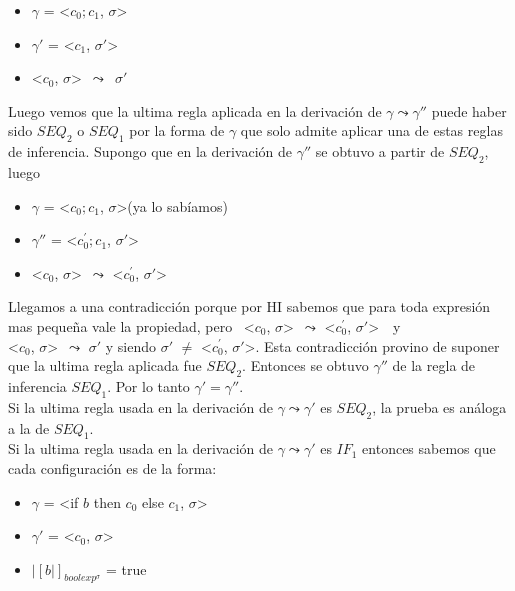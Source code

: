 \documentclass[a4paper,12pt]{article}
\begin{document}
\begin{itemize}
  \item $\gamma$ = \textless $c_{0};c_{1}$, $\sigma$\textgreater
  \item $\gamma'$ =  \textless $c_{1}$, $\sigma'$\textgreater
  \item \textless $c_{0}$, $\sigma$\textgreater \ $\leadsto$\ $\sigma'$
\end{itemize}

Luego vemos que la ultima regla aplicada en la derivación de $\gamma \leadsto \gamma''$ 
puede haber sido $SEQ_{2}$ o $SEQ_{1}$ por la forma de $\gamma$ que solo admite 
aplicar una de estas reglas de inferencia. Supongo que en la derivación de $\gamma''$
se obtuvo a partir de $SEQ_{2}$, luego 

\begin{itemize}
  \item $\gamma$ = \textless $c_{0};c_{1}$, $\sigma$\textgreater (ya lo sabíamos)
  \item $\gamma''$ =  \textless ${c^{'}_{0}};c_{1}$, $\sigma'$\textgreater
  \item \textless $c_{0}$, $\sigma$\textgreater\ $\leadsto$ \textless ${c_{0}^{'}}$, $\sigma'$\textgreater
\end{itemize}

Llegamos a una contradicción porque por HI sabemos que para toda expresión mas pequeña vale la 
propiedad, pero \  \textless $c_{0}$, $\sigma$\textgreater\ $\leadsto$ \textless ${c_{0}^{'}}$, $\sigma'$\textgreater \  \ y \\\textless $c_{0}$, $\sigma$\textgreater\ $\leadsto$  $\sigma'$ y 
  siendo
$\sigma'$ $\neq$ \textless ${c_{0}^{'}}$, $\sigma'$\textgreater . Esta contradicción provino de suponer
 que la ultima regla aplicada fue $SEQ_{2}$. Entonces se obtuvo $\gamma''$ de la regla de 
inferencia $SEQ_{1}$. Por lo tanto $\gamma' = \gamma''$.\\

Si la ultima regla usada en la derivación de $\gamma \leadsto \gamma'$ es $SEQ_{2}$, la prueba es 
análoga a la  de $SEQ_{1}$.\\

\newpage
Si la ultima regla usada en la derivación de $\gamma \leadsto \gamma'$ es $IF_{1}$ entonces sabemos que 
cada configuración es de la forma:

\begin{itemize}
  \item $\gamma$ = \textless if $b$ then $c_{0}$ else $c_{1}$, $\sigma$\textgreater
  \item $\gamma'$ =  \textless $c_{0}$, $\sigma$\textgreater
  \item $|[b|]_{boolexp^{\sigma}}$ = true 
\end{itemize}
\end{document}
